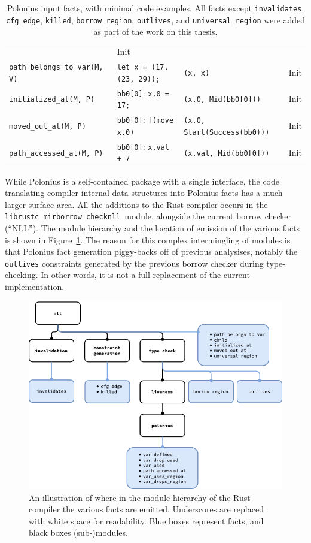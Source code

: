 \documentclass[11pt,a4paper,twoside,openany]{report}
\newcommand{\InRust}[1]{\texttt{#1}}
\newcommand{\InDatalog}[1]{\texttt{#1}}
\def\ModSep{\discretionary{::}{}{::}}
\begin{document}
{\begin{table}[!htbp]
\begin{tabular}{@{}l l@{} l@{} @{}l@{}}
       & Init  \\
  \InDatalog{path_belongs_to_var(M, V)} & \InRust{let x = (17, (23, 29));} & \InRust{(x, x)} & Init  \\
  \InDatalog{initialized_at(M, P)} & \InRust{bb0[0]}: \InRust{x.0 = 17;} & \InRust{(x.0, Mid(bb0[0]))} & Init  \\
  \InDatalog{moved_out_at(M, P)} & \InRust{bb0[0]}: \InRust{f(move x.0)} & \InRust{(x.0, Start(Success(bb0)))} & Init  \\
  \InDatalog{path_accessed_at(M, P)} & \InRust{bb0[0]}: \InRust{x.val + 7} & \InRust{(x.val, Mid(bb0[0]))} & Init
\end{tabular}
\caption[Input Facts to Polonius]{Polonius input facts, with minimal code
  examples. All facts except \texttt{invalidates}, \texttt{cfg\_edge},
  \texttt{killed}, \texttt{borrow\_region}, \texttt{outlives}, and
  \texttt{universal\_region} were added as part of the work on this thesis.}\label{tab:input-facts}
\end{table}%
}

While Polonius is a self-contained package with a single interface, the code
translating compiler-internal data structures into Polonius facts has a much
larger surface area. All the additions to the Rust compiler occurs in the
\texttt{librustc\_mir\ModSep{}borrow\_check\ModSep{}nll}~module, alongside the current borrow
checker (``NLL''). The module hierarchy and the location of emission of the
various facts is shown in Figure~\ref{fig:fact-module-hierarchy}. The reason for
this complex intermingling of modules is that Polonius fact generation
piggy-backs off of previous analysises, notably the \texttt{outlives}
constraints generated by the previous borrow checker during type-checking. In
other words, it is not a full replacement of the current implementation.

\begin{figure}[h!]
  \centering
  \includegraphics[width=0.9\linewidth]{Graphs/rustc-module-structure}
  \caption[Polonius In Rust's Module Hierarchy]{An illustration of where in the
    module hierarchy of the Rust compiler the various facts are emitted.
    Underscores are replaced with white space for readability. Blue boxes
    represent facts, and black boxes (sub-)modules.}\label{fig:fact-module-hierarchy}
\end{figure}
\end{document}
